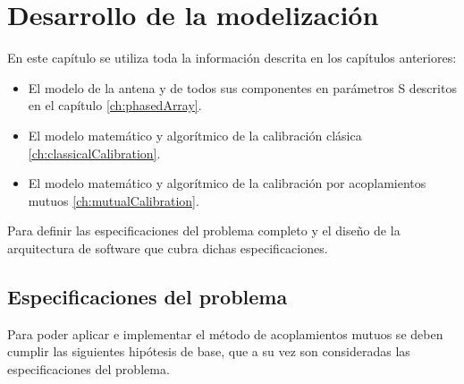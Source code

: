 \chapter{Desarrollo de la modelización}
\label{ch:modelizacion}


En este capítulo se utiliza toda la información descrita en los capítulos anteriores:
\begin{itemize}
	\item El modelo de la antena y de todos sus componentes en parámetros S descritos en el capítulo \ref{ch:phasedArray}.
	\item El modelo matemático y algorítmico de la calibración clásica \ref{ch:classicalCalibration}.
	\item El modelo matemático y algorítmico de la calibración por acoplamientos mutuos \ref{ch:mutualCalibration}.
\end{itemize}

Para definir las especificaciones del problema completo y el diseño de la arquitectura de software que cubra dichas especificaciones. 


\section{Especificaciones del problema} \label{sc:specifications}

Para poder aplicar e implementar el método de acoplamientos mutuos se deben cumplir las siguientes hipótesis de base, que a su
vez son consideradas las especificaciones del problema.

